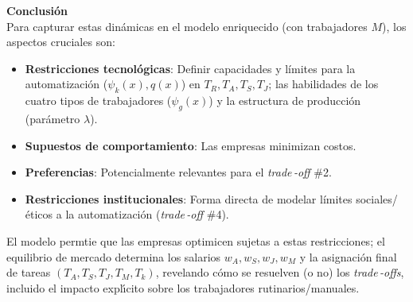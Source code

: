 \documentclass{article}
\theoremstyle{remark}
\theoremstyle{definition}
\begin{document}
\begin{enumerate}
\begin{tcolorbox}[title= Soluci\'on 2]
            \textbf{Conclusi\'on} \\
            Para capturar estas din\'amicas en el modelo enriquecido (con trabajadores $M$), los aspectos cruciales son:
            \begin{itemize}
              \item \textbf{Restricciones tecnol\'ogicas}: Definir capacidades y l\'imites para la automatizaci\'on ($\psi_k(x), q(x)$) en $T_R, T_A, T_S, T_J$; las habilidades de los cuatro tipos de trabajadores ($\psi_g(x)$) y la estructura de producci\'on (par\'ametro $\lambda$).
              \item \textbf{Supuestos de comportamiento}: Las empresas minimizan costos.
              \item \textbf{Preferencias}: Potencialmente relevantes para el \emph{trade\,-off} \#2.
              \item \textbf{Restricciones institucionales}: Forma directa de modelar l\'imites sociales/\'eticos a la automatizaci\'on (\emph{trade\,-off} \#4).
            \end{itemize}
            
            El modelo permtie que las empresas optimicen sujetas a estas restricciones; el equilibrio de mercado determina los salarios $w_A, w_S, w_J, w_M$ y la asignaci\'on final de tareas $(T_A, T_S, T_J, T_M, T_k)$, revelando c\'omo se resuelven (o no) los \emph{trade\,-offs}, incluido el impacto expl\'\i cito sobre los trabajadores rutinarios/manuales.

        \end{tcolorbox}
    

\end{enumerate}
\end{document}
